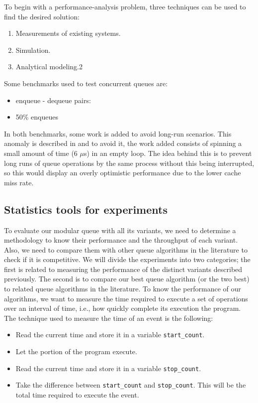To begin with a performance-analysis problem, three techniques can be used to find the desired solution:

\begin{enumerate}
\item Measurements of existing systems.
\item Simulation.
\item Analytical modeling.2
\end{enumerate}

Some benchmarks used to test concurrent queues are:

\begin{itemize}
\item enqueue - dequeue pairs:
\item 50\% enqueues
\end{itemize}

In both benchmarks, some work is added to avoid long-run scenarios. This
anomaly is described in \cite{DBLP_conf_podc_MichaelS96} and to avoid it, the
work added consists of spinning a small amount of time (6 \(\mu\)s) in an
empty loop. The idea behind this is to prevent long runs of queue operations
by the same process without this being interrupted, so this would display
an overly optimistic performance due to the lower cache miss rate.


\subsection{Statistics tools for experiments}
\label{sec:orga1c9a7a}

To evaluate our modular queue with all its variants, we need to determine a
methodology to know their performance and the throughput of each
variant. Also, we need to compare them with other queue algorithms in the
literature to check if it is competitive. We will divide the experiments into
two categories; the first is related to measuring the performance of the
distinct variants described previously. The second is to compare our best
queue algorithm (or the two best) to related queue algorithms in the
literature. To know the performance of our algorithms, we want to measure the
time required to execute a set of operations over an interval of time, i.e.,
how quickly complete its execution the program. The technique used to measure
the time of an event is the following:

\begin{itemize}
\item Read the current time and store it in a variable \texttt{start\_count}.
\item Let the portion of the program execute.
\item Read the current time and store it in a variable \texttt{stop\_count}.
\item Take the difference between \texttt{start\_count} and \texttt{stop\_count}. This will be the
total time required to execute the event.
\end{itemize}

